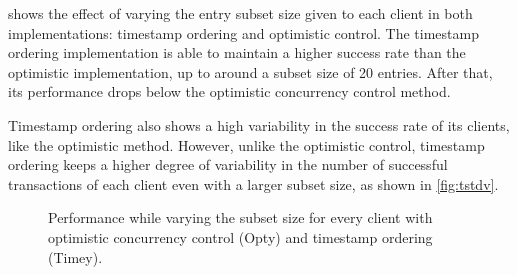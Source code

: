 \documentclass[a4paper, 10pt]{article}
\begin{document}
 shows the effect of varying the entry subset size given to each client in both implementations: timestamp ordering and optimistic control. The timestamp ordering implementation is able to maintain a higher success rate than the optimistic implementation, up to around a subset size of 20 entries. After that, its performance drops below the optimistic concurrency control method.

Timestamp ordering also shows a high variability in the success rate of its clients, like the optimistic method. However, unlike the optimistic control, timestamp ordering keeps a higher degree of variability in the number of successful transactions of each client even with a larger subset size, as shown in \cref{fig:tstdv}.

\begin{figure}[htp]
\begin{center}
\caption{Performance while varying the subset size for every client with optimistic concurrency control (Opty) and timestamp ordering (Timey).}
\label{fig:tvi}
\end{center}
\end{figure}
\end{document}
